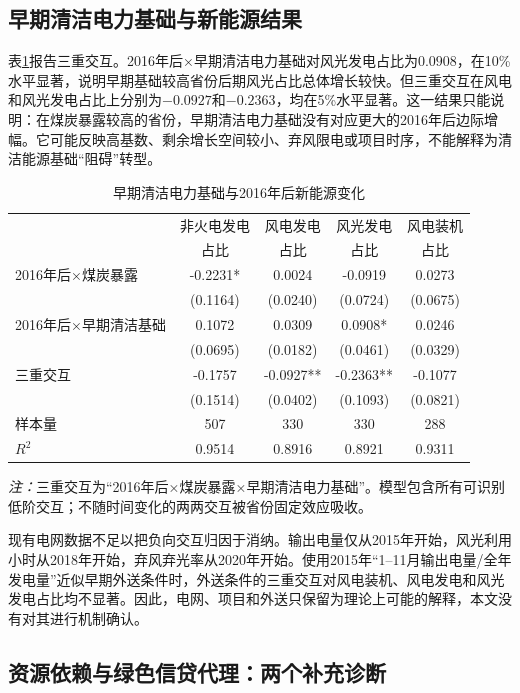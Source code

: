 \documentclass[UTF8,12pt]{ctexart}
\newcommand{\note}[1]{\begin{minipage}{0.96\textwidth}\footnotesize\textit{注：}#1\end{minipage}}
\begin{document}
\subsection{早期清洁电力基础与新能源结果}

表\ref{tab:cleanbase}报告三重交互。2016年后×早期清洁电力基础对风光发电占比为$0.0908$，在10\%水平显著，说明早期基础较高省份后期风光占比总体增长较快。但三重交互在风电和风光发电占比上分别为$-0.0927$和$-0.2363$，均在5\%水平显著。这一结果只能说明：在煤炭暴露较高的省份，早期清洁电力基础没有对应更大的2016年后边际增幅。它可能反映高基数、剩余增长空间较小、弃风限电或项目时序，不能解释为清洁能源基础“阻碍”转型。

\begin{table}[H]
\centering
\caption{早期清洁电力基础与2016年后新能源变化}
\label{tab:cleanbase}
\begin{tabular}{lcccc}
\toprule
 & 非火电发电 & 风电发电 & 风光发电 & 风电装机 \\
 & 占比 & 占比 & 占比 & 占比 \\
\midrule
2016年后×煤炭暴露 & -0.2231* & 0.0024 & -0.0919 & 0.0273 \\
 & (0.1164) & (0.0240) & (0.0724) & (0.0675) \\
2016年后×早期清洁基础 & 0.1072 & 0.0309 & 0.0908* & 0.0246 \\
 & (0.0695) & (0.0182) & (0.0461) & (0.0329) \\
三重交互 & -0.1757 & -0.0927** & -0.2363** & -0.1077 \\
 & (0.1514) & (0.0402) & (0.1093) & (0.0821) \\
样本量 & 507 & 330 & 330 & 288 \\
$R^2$ & 0.9514 & 0.8916 & 0.8921 & 0.9311 \\
\bottomrule
\end{tabular}
\note{三重交互为“2016年后×煤炭暴露×早期清洁电力基础”。模型包含所有可识别低阶交互；不随时间变化的两两交互被省份固定效应吸收。}
\end{table}

现有电网数据不足以把负向交互归因于消纳。输出电量仅从2015年开始，风光利用小时从2018年开始，弃风弃光率从2020年开始。使用2015年“1--11月输出电量/全年发电量”近似早期外送条件时，外送条件的三重交互对风电装机、风电发电和风光发电占比均不显著。因此，电网、项目和外送只保留为理论上可能的解释，本文没有对其进行机制确认。

\subsection{资源依赖与绿色信贷代理：两个补充诊断}
\end{document}

